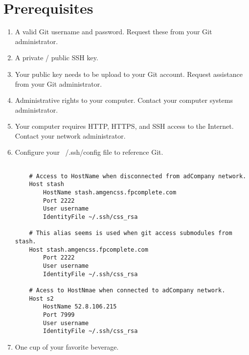 \section{Prerequisites}
\begin{enumerate}
\item
A valid Git username and password.  Request these from your Git administrator.

\item
A private / public SSH key.

\item
Your public key needs to be upload to your Git account.  Request assistance from
your Git administrator.

\item
Administrative rights to your computer.  Contact your computer systems administrator.

\item
Your computer requires HTTP, HTTPS, and SSH access to the Internet.  Contact your network
administrator.

\item
Configure your ~/.ssh/config file to reference Git.
\begin{verbatim}

    # Access to HostName when disconnected from adCompany network.
    Host stash
        HostName stash.amgencss.fpcomplete.com
        Port 2222
        User username
        IdentityFile ~/.ssh/css_rsa

    # This alias seems is used when git access submodules from stash.
    Host stash.amgencss.fpcomplete.com
        Port 2222
        User username
        IdentityFile ~/.ssh/css_rsa

    # Acess to HostNmae when connected to adCompany network.
    Host s2
        HostName 52.8.106.215
        Port 7999
        User username
        IdentityFile ~/.ssh/css_rsa

\end{verbatim}

\item
One cup of your favorite beverage.
\end{enumerate}
